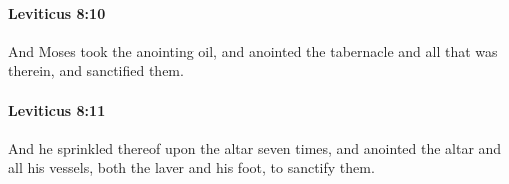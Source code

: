 		\paragraph{Leviticus 8:10} %
			\label{LEVITICUS-8-10}

			And Moses took the anointing oil, and anointed the tabernacle and all that was therein, and sanctified them.


		\paragraph{Leviticus 8:11} %
			\label{LEVITICUS-8-11}

			And he sprinkled thereof upon the altar seven times, and anointed the altar and all his vessels, both the laver and his foot, to sanctify them.


